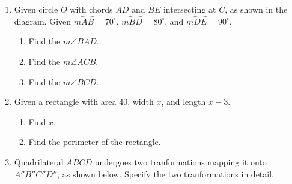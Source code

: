 \documentclass[12pt, twoside]{article}
\begin{document}
\begin{enumerate}
\newpage


\item Given circle $O$ with chords $\overline{AD}$ and $\overline{BE}$ intersecting at $C$, as shown in the diagram. Given $m \wideparen{AB}=70^\circ$, $m \wideparen{BD}=80^\circ$, and $m \wideparen{DE}=90^\circ$.
  \begin{multicols}{2}
   \raggedcolumns
   \begin{enumerate}
     \item Find the $m\angle BAD$. \vspace{1.7cm}
     \item Find the $m\angle ACB$. \vspace{2cm}
     \item Find the $m\angle BCD$. \vspace{2cm}
   \end{enumerate}
  \end{multicols}
\vspace{2cm}

\item Given a rectangle with area 40, width $x$, and length $x-3$.
  \begin{enumerate}
    \item Find $x$. \vspace{4cm}
    \item Find the perimeter of the rectangle.
  \end{enumerate}

\newpage

  \item Quadrilateral $ABCD$ undergoes two tranformations mapping it onto $A''B''C''D''$, as shown below. Specify the two tranformations in detail.
    \vspace{1.75cm}


\end{enumerate}
\end{document}
